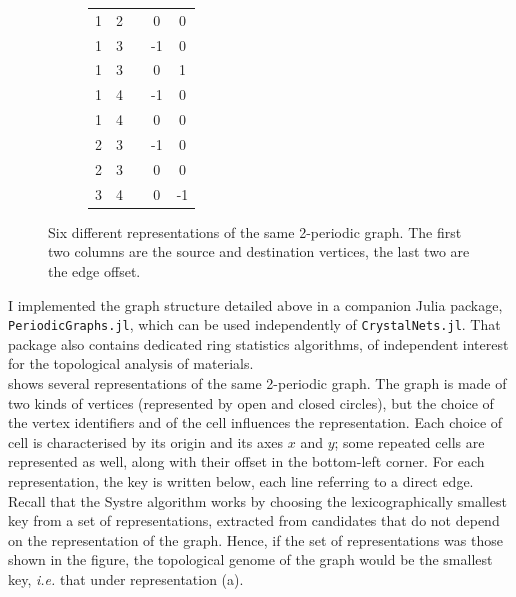 \documentclass[main.tex]{subfiles}
\begin{document}
\begin{figure}[t]
\begin{subfigure}[b]{0.35\linewidth}
		\centering\scriptsize\begin{tabular}{ccccc}
			1&2&&0&0\\
			1&3&&-1&0\\
			1&3&&0&1\\
			1&4&&-1&0\\
			1&4&&0&0\\
			2&3&&-1&0\\
			2&3&&0&0\\
			3&4&&0&-1
		\end{tabular}
		\vspace{-0.5em}
	\end{subfigure}
	\vspace{2mm}
	\caption{Six different representations of the same 2-periodic graph. The first two columns are the source and destination vertices, the last two are the edge offset.} \label{periodiccells}
\end{figure}

I implemented the graph structure detailed above in a companion Julia package, \texttt{PeriodicGraphs.jl}, which can be used independently of \texttt{CrystalNets.jl}. That package also contains dedicated ring statistics algorithms, of independent interest for the topological analysis of materials.\\

 shows several representations of the same 2-periodic graph. The graph is made of two kinds of vertices (represented by open and closed circles), but the choice of the vertex identifiers and of the cell influences the representation. Each choice of cell is characterised by its origin and its axes $x$ and $y$; some repeated cells are represented as well, along with their offset in the bottom-left corner. For each representation, the key is written below, each line referring to a direct edge. Recall that the Systre algorithm works by choosing the lexicographically smallest key from a set of representations, extracted from candidates that do not depend on the representation of the graph. Hence, if the set of representations was those shown in the figure, the topological genome of the graph would be the smallest key, \textit{i.e.} that under representation {\sffamily(a)}.

\end{document}
